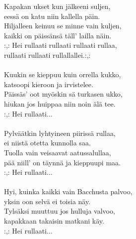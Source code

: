 
Kapakan ukset kun jälkeeni suljen, \\ eessä on katu niin kallella päin. \\ Hiljalleen keinuu se minne vain kuljen, \\ kaikki on päissänsä täll' lailla näin. \\ :,: Hei rullaati rullaati rullaati rullaa, \\ rullaati rullaati rullallallei.:,: \\ \hspace{10mm} \\ Kuukin se kieppuu kuin orrella kukko, \\ katsoopi kieroon ja irvistelee. \\ Päissäs' oot myöskin sä turkasen ukko, \\ hiukan jos huippaa niin noin älä tee. \\ :,: Hei rullaati... \\ \hspace{10mm} \\ Pylväätkin lyhtyineen piirissä rullaa, \\ ei niistä otetta kunnolla saa. \\ Tuolla vain veisaavat aatussalullaa, \\ pää niill' on täynnä ja kieppuupi maa. \\ :,: Hei rullaati... \\ \hspace{10mm} \\ Hyi, kuinka kaikki vain Bacchusta palvoo, \\ yksin oon selvä ei toisia näy. \\ Tylsäksi muuttuu jos hulluja valvoo, \\ kapakkaan takaisin matkani käy. \\ :,: Hei rullaati...